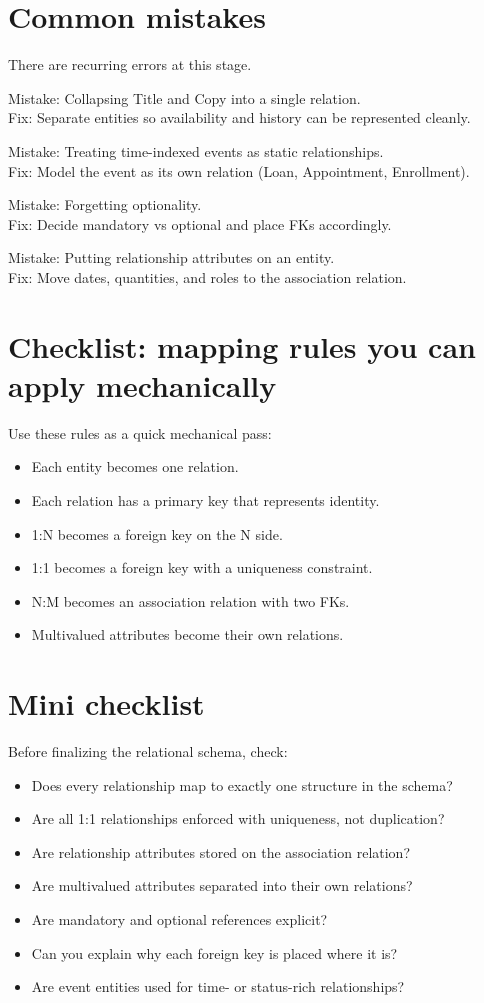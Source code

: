 \section{Common mistakes}
There are recurring errors at this stage.

Mistake: Collapsing Title and Copy into a single relation.\\
Fix: Separate entities so availability and history can be represented cleanly.

Mistake: Treating time-indexed events as static relationships.\\
Fix: Model the event as its own relation (Loan, Appointment, Enrollment).

Mistake: Forgetting optionality.\\
Fix: Decide mandatory vs optional and place FKs accordingly.

Mistake: Putting relationship attributes on an entity.\\
Fix: Move dates, quantities, and roles to the association relation.

\section{Checklist: mapping rules you can apply mechanically}
Use these rules as a quick mechanical pass:
\begin{itemize}[leftmargin=*,nosep]
  \item Each entity becomes one relation.
  \item Each relation has a primary key that represents identity.
  \item 1:N becomes a foreign key on the N side.
  \item 1:1 becomes a foreign key with a uniqueness constraint.
  \item N:M becomes an association relation with two FKs.
  \item Multivalued attributes become their own relations.
\end{itemize}

\section{Mini checklist}
Before finalizing the relational schema, check:
\begin{itemize}[leftmargin=*,nosep]
  \item Does every relationship map to exactly one structure in the schema?
  \item Are all 1:1 relationships enforced with uniqueness, not duplication?
  \item Are relationship attributes stored on the association relation?
  \item Are multivalued attributes separated into their own relations?
  \item Are mandatory and optional references explicit?
  \item Can you explain why each foreign key is placed where it is?
  \item Are event entities used for time- or status-rich relationships?
\end{itemize}

